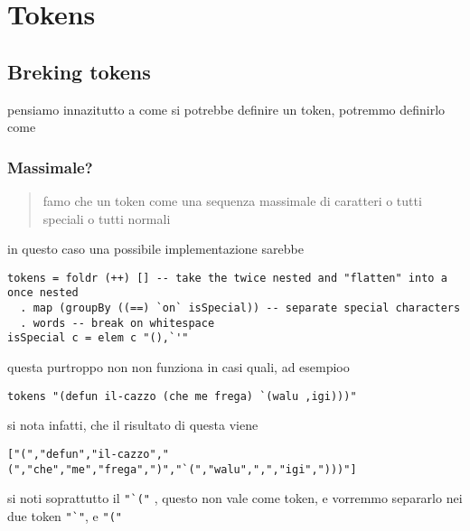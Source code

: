 \documentclass[11pt]{article}
\author{Biggie Dickus}
\date{\today}
\title{}
\begin{document}
\tableofcontents

\section{Tokens}
\label{sec:orgc250f3c}
\subsection{Breking tokens}
\label{sec:org1186f84}
pensiamo innazitutto a come si potrebbe definire un token, potremmo definirlo come
\subsubsection{Massimale?}
\label{sec:org386b0f1}
\begin{quote}
famo che un token come una sequenza massimale di caratteri o tutti speciali o tutti normali
\end{quote}
in questo caso una possibile implementazione sarebbe
\begin{verbatim}
tokens = foldr (++) [] -- take the twice nested and "flatten" into a once nested
  . map (groupBy ((==) `on` isSpecial)) -- separate special characters
  . words -- break on whitespace
isSpecial c = elem c "(),`'"
\end{verbatim}

questa purtroppo non non funziona in casi quali, ad esempioo
\begin{verbatim}
tokens "(defun il-cazzo (che me frega) `(walu ,igi)))"
\end{verbatim}

si nota infatti, che il risultato di questa viene
\begin{verbatim}
["(","defun","il-cazzo","(","che","me","frega",")","`(","walu",",","igi",")))"]
\end{verbatim}

si noti soprattutto il \texttt{"`("} , questo non vale come token, e vorremmo separarlo nei due token \texttt{"`"}, e \texttt{"("}
\end{document}
